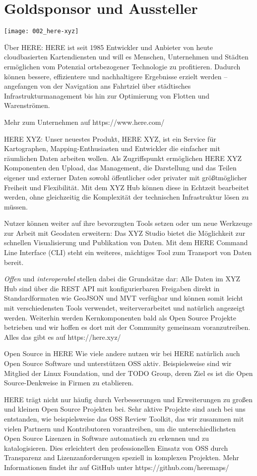 \section*{Goldsponsor und Aussteller}
\begin{center}
  \texttt{[image: 002\_here-xyz]}
\end{center}
Über HERE: HERE ist seit 1985 Entwickler und Anbieter von heute cloudbasierten Kartendiensten und will es Menschen, Unternehmen und Städten ermöglichen vom Potenzial ortsbezogener Technologie zu profitieren. Dadurch können bessere, effizientere und nachhaltigere Ergebnisse erzielt werden – angefangen von der Navigation ans Fahrtziel über städtisches Infrastrukturmanagement bis hin zur Optimierung von Flotten und Warenströmen.

Mehr zum Unternehmen auf https://www.here.com/

HERE XYZ: Unser neuestes Produkt, HERE XYZ, ist ein Service für Kartographen, Mapping-Enthusiasten und Entwickler die einfacher mit räumlichen Daten arbeiten wollen. Als Zugriffspunkt ermöglichen HERE XYZ Komponenten den Upload, das Management, die Darstellung und das Teilen eigener und externer Daten sowohl öffentlicher oder privater mit größtmöglicher Freiheit und Flexibilität. Mit dem XYZ Hub können diese in Echtzeit bearbeitet werden, ohne gleichzeitig die Komplexität der technischen Infrastruktur lösen zu müssen.

Nutzer können weiter auf ihre bevorzugten Tools setzen oder um neue Werkzeuge zur Arbeit mit Geodaten erweitern: Das XYZ Studio bietet die Möglichkeit zur schnellen Visualisierung und Publikation von Daten. Mit dem HERE Command Line Interface (CLI) steht ein weiteres, mächtiges Tool zum Transport von Daten bereit.

\emph{Offen} und \emph{interoperabel} stellen dabei die Grundsätze dar: Alle Daten im XYZ Hub sind über die REST API mit konfigurierbaren Freigaben direkt in Standardformaten wie GeoJSON und MVT verfügbar und können somit leicht mit verschiedensten Tools verwendet, weiterverarbeitet und natürlich angezeigt werden. Weiterhin werden Kernkomponenten bald als Open Source Projekte betrieben und wir hoffen es dort mit der Community gemeinsam voranzutreiben. Alles das gibt es auf https://here.xyz/

Open Source in HERE Wie viele andere nutzen wir bei HERE natürlich auch Open Source Software und unterstützen OSS aktiv. Beispielsweise sind wir Mitglied der Linux Foundation, und der TODO Group, deren Ziel es ist die Open Source-Denkweise in Firmen zu etablieren.

HERE trägt nicht nur häufig durch Verbesserungen und Erweiterungen zu großen und kleinen Open Source Projekten bei. Sehr aktive Projekte sind auch bei uns entstanden, wie beispielsweise das OSS Review Toolkit, das wir zusammen mit vielen Partnern und Kontributoren vorantreiben, um die unterschiedlichsten Open Source Lizenzen in Software automatisch zu erkennen und zu katalogisieren. Dies erleichtert den professionellen Einsatz von OSS durch Transparenz and Lizenzanforderungen speziell in komplexen Projekten. Mehr Informationen findet ihr auf GitHub unter https://github.com/heremaps/
